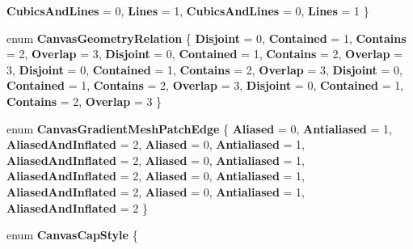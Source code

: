 \begin{DoxyCompactItemize}
{\bfseries Cubics\+And\+Lines} = 0, 
{\bfseries Lines} = 1, 
\newline
{\bfseries Cubics\+And\+Lines} = 0, 
{\bfseries Lines} = 1
 \}
\item 
\mbox{\label{namespace_microsoft_1_1_graphics_1_1_canvas_1_1_geometry_abb27c8fb8d2b8f00eb3225ac6f3531e3}} 
enum {\bfseries Canvas\+Geometry\+Relation} \{ \newline
{\bfseries Disjoint} = 0, 
{\bfseries Contained} = 1, 
{\bfseries Contains} = 2, 
{\bfseries Overlap} = 3, 
\newline
{\bfseries Disjoint} = 0, 
{\bfseries Contained} = 1, 
{\bfseries Contains} = 2, 
{\bfseries Overlap} = 3, 
\newline
{\bfseries Disjoint} = 0, 
{\bfseries Contained} = 1, 
{\bfseries Contains} = 2, 
{\bfseries Overlap} = 3, 
\newline
{\bfseries Disjoint} = 0, 
{\bfseries Contained} = 1, 
{\bfseries Contains} = 2, 
{\bfseries Overlap} = 3, 
\newline
{\bfseries Disjoint} = 0, 
{\bfseries Contained} = 1, 
{\bfseries Contains} = 2, 
{\bfseries Overlap} = 3
 \}
\item 
\mbox{\label{namespace_microsoft_1_1_graphics_1_1_canvas_1_1_geometry_ad355c607a325a3422031f9e574b3dd1b}} 
enum {\bfseries Canvas\+Gradient\+Mesh\+Patch\+Edge} \{ \newline
{\bfseries Aliased} = 0, 
{\bfseries Antialiased} = 1, 
{\bfseries Aliased\+And\+Inflated} = 2, 
{\bfseries Aliased} = 0, 
\newline
{\bfseries Antialiased} = 1, 
{\bfseries Aliased\+And\+Inflated} = 2, 
{\bfseries Aliased} = 0, 
{\bfseries Antialiased} = 1, 
\newline
{\bfseries Aliased\+And\+Inflated} = 2, 
{\bfseries Aliased} = 0, 
{\bfseries Antialiased} = 1, 
{\bfseries Aliased\+And\+Inflated} = 2, 
\newline
{\bfseries Aliased} = 0, 
{\bfseries Antialiased} = 1, 
{\bfseries Aliased\+And\+Inflated} = 2
 \}
\item 
\mbox{\label{namespace_microsoft_1_1_graphics_1_1_canvas_1_1_geometry_aceede6fdba7f9ce2af9afb615db0aebf}} 
enum {\bfseries Canvas\+Cap\+Style} \{ \newline

\end{DoxyCompactItemize}
